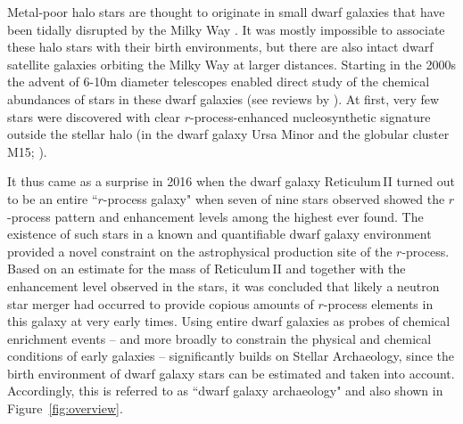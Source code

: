 \documentclass[letterpaper]{article}
\begin{document}
Metal-poor halo stars are thought to originate in small dwarf galaxies that have been tidally disrupted by the Milky Way \citep{Frebel2015}.
It was mostly impossible to associate these halo stars with their birth environments, but there are also intact dwarf satellite galaxies orbiting the Milky Way at larger distances.
Starting in the 2000s \citep[e.g.,][]{Shetrone01,shetrone03,Koch08} the advent of 6-10m diameter telescopes enabled direct study of the chemical abundances of stars in these dwarf galaxies (see reviews by \citealt{Venn04,Tolstoy2009,Frebel2015,Simon2019}).
At first, very few stars were discovered with clear $r$-process-enhanced nucleosynthetic signature outside the stellar halo (in the dwarf galaxy Ursa Minor and the globular cluster M15; \citealt{Otsuki06, aoki2007_cos82, Cohen2009}).

It thus came as a surprise in 2016 when the dwarf galaxy Reticulum\,II \citep{Ji2016b, Roederer2016} turned out to be an entire ``$r$-process galaxy" when seven of nine stars observed showed the $r$-process pattern and enhancement levels among the highest ever found. The existence of such stars in a known and quantifiable dwarf galaxy environment provided a novel constraint on the astrophysical production site of the $r$-process. Based on an estimate for the mass of Reticulum\,II and together with the enhancement level observed in the stars, it was concluded that likely a neutron star merger had occurred to provide copious amounts of $r$-process elements in this galaxy at very early times. Using entire dwarf galaxies as probes of chemical enrichment events -- and more broadly to constrain the physical and chemical conditions of early galaxies --  significantly builds on Stellar Archaeology, since the birth environment of dwarf galaxy stars can be estimated and taken into account. Accordingly, this is referred to as ``dwarf galaxy archaeology" and also shown in Figure~\ref{fig:overview}.


\end{document}
